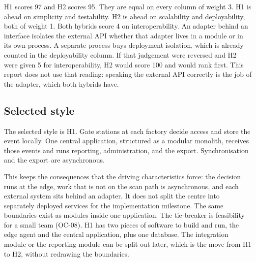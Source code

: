 H1 scores 97 and H2 scores 95.
They are equal on every column of weight 3.
H1 is ahead on simplicity and testability.
H2 is ahead on scalability and deployability, both of weight 1.
Both hybrids score 4 on interoperability.
An adapter behind an interface isolates the external API whether that adapter lives in a module or in its own process.
A separate process buys deployment isolation, which is already counted in the deployability column.
If that judgement were reversed and H2 were given 5 for interoperability, H2 would score 100 and would rank first.
This report does not use that reading: speaking the external API correctly is the job of the adapter, which both hybrids have.

\subsection{Selected style}

The selected style is H1.
Gate stations at each factory decide access and store the event locally.
One central application, structured as a modular monolith, receives those events and runs reporting, administration, and the export.
Synchronisation and the export are asynchronous.

This keeps the consequences that the driving characteristics force: the decision runs at the edge, work that is not on the scan path is asynchronous, and each external system sits behind an adapter.
It does not split the centre into separately deployed services for the implementation milestone.
The same boundaries exist as modules inside one application.
The tie-breaker is feasibility for a small team (OC-08).
H1 has two pieces of software to build and run, the edge agent and the central application, plus one database.
The integration module or the reporting module can be split out later, which is the move from H1 to H2, without redrawing the boundaries.

